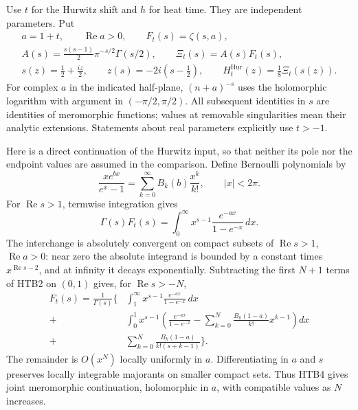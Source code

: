 Use $t$ for the Hurwitz shift and $h$ for heat time. They are independent
parameters. Put
\begin{equation}\tag{HTB1}
\begin{gathered}
 a=1+t,\qquad \operatorname{Re}a>0,\qquad
 F_t(s)=\zeta(s,a),\\
 A(s)=\frac{s(s-1)}2\pi^{-s/2}\Gamma(s/2),\qquad
 \Xi_t(s)=A(s)F_t(s),\\
 s(z)=\frac12+\frac{iz}{2},\qquad
 z(s)=-2i\left(s-\frac12\right),\qquad
 H_t^{\mathrm{Hur}}(z)=\frac18\Xi_t(s(z)).
\end{gathered}
\end{equation}
For complex $a$ in the indicated half-plane, $(n+a)^{-s}$ uses the
holomorphic logarithm with argument in $(-\pi/2,\pi/2)$. All subsequent
identities in $s$ are identities of meromorphic functions; values at
removable singularities mean their analytic extensions. Statements about
real parameters explicitly use $t>-1$.

Here is a direct continuation of the Hurwitz input, so that neither its
pole nor the endpoint values are assumed in the comparison. Define
Bernoulli polynomials by
\begin{equation}\tag{HTB2}
 \frac{x e^{b x}}{e^x-1}
 =\sum_{k=0}^{\infty}B_k(b)\frac{x^k}{k!},\qquad |x|<2\pi.
\end{equation}
For $\operatorname{Re}s>1$, termwise integration gives
\begin{equation}\tag{HTB3}
 \Gamma(s)F_t(s)
 =\int_0^{\infty}x^{s-1}\frac{e^{-a x}}{1-e^{-x}}\,dx.
\end{equation}
The interchange is absolutely convergent on compact subsets of
$\operatorname{Re}s>1$, $\operatorname{Re}a>0$: near zero the absolute
integrand is bounded by a constant times $x^{\operatorname{Re}s-2}$,
and at infinity it decays exponentially. Subtracting the first $N+1$
terms of HTB2 on $(0,1)$ gives, for $\operatorname{Re}s>-N$,
\begin{equation}\tag{HTB4}
\begin{split}
 F_t(s)=\frac1{\Gamma(s)}\bigg\{
 &\int_1^{\infty}x^{s-1}\frac{e^{-a x}}{1-e^{-x}}\,dx\\
 +&\int_0^1x^{s-1}
 \left(\frac{e^{-a x}}{1-e^{-x}}
       -\sum_{k=0}^{N}\frac{B_k(1-a)}{k!}x^{k-1}\right)dx\\
 +&\sum_{k=0}^{N}\frac{B_k(1-a)}{k!(s+k-1)}\bigg\}.
\end{split}
\end{equation}
The remainder is $O(x^N)$ locally uniformly in $a$. Differentiating in
$a$ and $s$ preserves locally integrable majorants on smaller compact
sets. Thus HTB4 gives joint meromorphic continuation, holomorphic in
$a$, with compatible values as $N$ increases.

